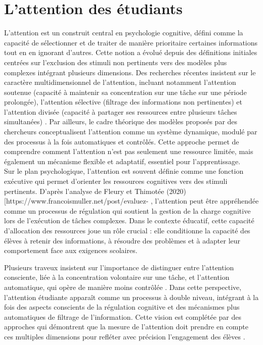 \section{L'attention des étudiants}
	L'attention est un construit central en psychologie cognitive, défini comme la capacité de sélectionner et de traiter de manière prioritaire certaines informations tout en en ignorant d'autres. Cette notion a évolué depuis des définitions initiales centrées sur l'exclusion des stimuli non pertinents vers des modèles plus complexes intégrant plusieurs dimensions. Des recherches récentes insistent sur le caractère multidimensionnel de l'attention, incluant notamment l'attention soutenue (capacité à maintenir sa concentration sur une tâche sur une période prolongée), l'attention sélective (filtrage des informations non pertinentes) et l'attention divisée (capacité à partager ses ressources entre plusieurs tâches simultanées) \cite{ELBAZINI}.
	Par ailleurs, le cadre théorique des modèles proposés par des chercheurs conceptualisent l'attention comme un système dynamique, modulé par des processus à la fois automatiques et contrôlés. Cette approche permet de comprendre comment l'attention n'est pas seulement une ressource limitée, mais également un mécanisme flexible et adaptatif, essentiel pour l'apprentissage. \cite{Pinelli_Portrat_2023} \\
	Sur le plan psychologique, l'attention est souvent définie comme une fonction exécutive qui permet d'orienter les ressources cognitives vers des stimuli pertinents. D'après l'analyse de Fleury et Thimotée (2020) [https://www.francoismuller.net/post/evaluez-%
	, l'attention peut être appréhendée comme un processus de régulation qui soutient la gestion de la charge cognitive lors de l'exécution de tâches complexes. Dans le contexte éducatif, cette capacité d'allocation des ressources joue un rôle crucial : elle conditionne la capacité des élèves à retenir des informations, à résoudre des problèmes et à adapter leur comportement face aux exigences scolaires.
	
	Plusieurs traveux insistent sur l'importance de distinguer entre l'attention consciente, liée à la concentration volontaire sur une tâche, et l'attention automatique, qui opère de manière moins contrôlée \cite{Chesné_Piedfer}. Dans cette perspective, l'attention étudiante apparaît comme un processus à double niveau, intégrant à la fois des aspects conscients de la régulation cognitive et des mécanismes plus automatiques de filtrage de l'information. Cette vision est complétée par des approches qui démontrent que la mesure de l'attention doit prendre en compte ces multiples dimensions pour refléter avec précision l'engagement des élèves \cite{Ufapec_van}. 
	
